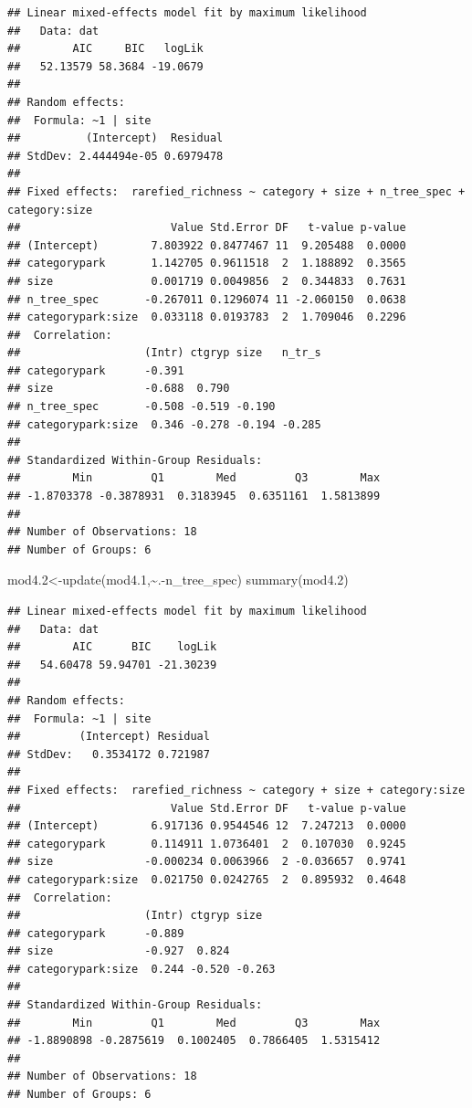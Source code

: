 \documentclass[
]{article}
\newenvironment{Shaded}{\begin{snugshade}}{\end{snugshade}}
\newcommand{\FloatTok}[1]{\textcolor[rgb]{0.00,0.00,0.81}{#1}}
\newcommand{\FunctionTok}[1]{\textcolor[rgb]{0.00,0.00,0.00}{#1}}
\newcommand{\NormalTok}[1]{#1}
\newcommand{\OtherTok}[1]{\textcolor[rgb]{0.56,0.35,0.01}{#1}}
\newcommand{\SpecialCharTok}[1]{\textcolor[rgb]{0.00,0.00,0.00}{#1}}
\begin{document}
\begin{verbatim}
## Linear mixed-effects model fit by maximum likelihood
##   Data: dat 
##        AIC     BIC   logLik
##   52.13579 58.3684 -19.0679
## 
## Random effects:
##  Formula: ~1 | site
##          (Intercept)  Residual
## StdDev: 2.444494e-05 0.6979478
## 
## Fixed effects:  rarefied_richness ~ category + size + n_tree_spec + category:size 
##                       Value Std.Error DF   t-value p-value
## (Intercept)        7.803922 0.8477467 11  9.205488  0.0000
## categorypark       1.142705 0.9611518  2  1.188892  0.3565
## size               0.001719 0.0049856  2  0.344833  0.7631
## n_tree_spec       -0.267011 0.1296074 11 -2.060150  0.0638
## categorypark:size  0.033118 0.0193783  2  1.709046  0.2296
##  Correlation: 
##                   (Intr) ctgryp size   n_tr_s
## categorypark      -0.391                     
## size              -0.688  0.790              
## n_tree_spec       -0.508 -0.519 -0.190       
## categorypark:size  0.346 -0.278 -0.194 -0.285
## 
## Standardized Within-Group Residuals:
##        Min         Q1        Med         Q3        Max 
## -1.8703378 -0.3878931  0.3183945  0.6351161  1.5813899 
## 
## Number of Observations: 18
## Number of Groups: 6
\end{verbatim}

\begin{Shaded}
\begin{Highlighting}[]
\NormalTok{mod4}\FloatTok{.2}\OtherTok{\textless{}{-}}\FunctionTok{update}\NormalTok{(mod4}\FloatTok{.1}\NormalTok{,}\SpecialCharTok{\textasciitilde{}}\NormalTok{.}\SpecialCharTok{{-}}\NormalTok{n\_tree\_spec)}
\FunctionTok{summary}\NormalTok{(mod4}\FloatTok{.2}\NormalTok{)}
\end{Highlighting}
\end{Shaded}

\begin{verbatim}
## Linear mixed-effects model fit by maximum likelihood
##   Data: dat 
##        AIC      BIC    logLik
##   54.60478 59.94701 -21.30239
## 
## Random effects:
##  Formula: ~1 | site
##         (Intercept) Residual
## StdDev:   0.3534172 0.721987
## 
## Fixed effects:  rarefied_richness ~ category + size + category:size 
##                       Value Std.Error DF   t-value p-value
## (Intercept)        6.917136 0.9544546 12  7.247213  0.0000
## categorypark       0.114911 1.0736401  2  0.107030  0.9245
## size              -0.000234 0.0063966  2 -0.036657  0.9741
## categorypark:size  0.021750 0.0242765  2  0.895932  0.4648
##  Correlation: 
##                   (Intr) ctgryp size  
## categorypark      -0.889              
## size              -0.927  0.824       
## categorypark:size  0.244 -0.520 -0.263
## 
## Standardized Within-Group Residuals:
##        Min         Q1        Med         Q3        Max 
## -1.8890898 -0.2875619  0.1002405  0.7866405  1.5315412 
## 
## Number of Observations: 18
## Number of Groups: 6
\end{verbatim}
\end{document}
